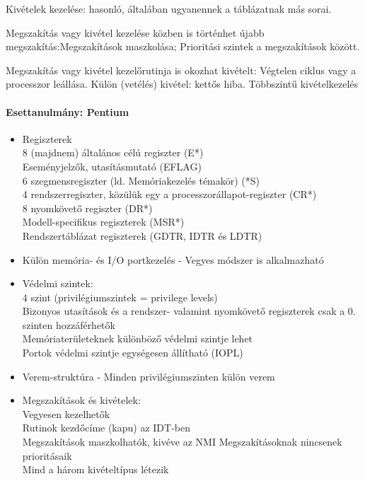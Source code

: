 \documentclass[fleqn,10pt,a4paper]{article}
\theoremstyle{magyar}
\begin{document}
  Kivételek kezelése: hasonló, általában ugyanennek a táblázatnak más sorai.

  Megszakítás vagy kivétel kezelése közben is történhet újabb megszakítás:Megszakítások maszkolása; Prioritási szintek a
  megszakítások között.
  
  Megszakítás vagy kivétel kezelőrutinja is okozhat kivételt: Végtelen ciklus vagy a processzor leállása. Külön (vetélés) kivétel: kettős hiba.
  Többszintű kivételkezelés

  \paragraph{Esettanulmány: Pentium}
  \begin{itemize}
  \item  Regiszterek\\
    8 (majdnem) általános célú regiszter (E*)\\
    Eseményjelzők, utasításmutató (EFLAG) \\
    6 szegmensregiszter (ld. Memóriakezelés témakör) (*S)\\
    4 rendszerregiszter, közülük egy a processzorállapot-regiszter (CR*)\\
    8 nyomkövető regiszter (DR*)\\
    Modell-specifikus regiszterek (MSR*)\\
    Rendszertáblázat regiszterek (GDTR, IDTR és LDTR)
  \item Külön memória- és I/O portkezelés - Vegyes módszer is alkalmazható
  \item Védelmi szintek:\\
    4 szint (privilégiumszintek = privilege levels)\\
    Bizonyos utasítások és a rendszer- valamint nyomkövető regiszterek csak a 0. szinten hozzáférhetők\\
    Memóriaterületeknek különböző védelmi szintje lehet\\
    Portok védelmi szintje egységesen állítható (IOPL)
  \item Verem-struktúra -  Minden privilégiumszinten külön verem
  \item Megszakítások és kivételek:\\
    Vegyesen kezelhetők\\
    Rutinok kezdőcíme (kapu) az IDT-ben\\
    Megszakítások maszkolhatók, kivéve az NMI Megszakításoknak nincsenek prioritásaik\\
    Mind a három kivételtípus létezik\\

\end{itemize}
\end{document}

